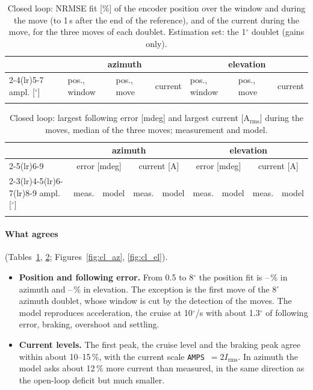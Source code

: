 \documentclass[10pt,a4paper]{article}
\numberwithin{equation}{section}
\begin{document}
\begin{table}[H]\centering\scriptsize\setlength{\tabcolsep}{3pt}
\caption{Closed loop: NRMSE fit [\%] of the encoder position over the window and during the move (to 1\,s after the end of the reference), and of the current during the move, for the three moves of each doublet. Estimation set: the 1$^\circ$ doublet (gains only).}\label{tab:cl}
\begin{tabular}{lllllll}\toprule
& \multicolumn{3}{c}{azimuth} & \multicolumn{3}{c}{elevation} \\
\cmidrule(lr){2-4}\cmidrule(lr){5-7}
ampl. [$^\circ$] & pos., window & pos., move & current & pos., window & pos., move & current \\ \midrule
\\ \bottomrule
\end{tabular}\end{table}

\begin{table}[H]\centering\footnotesize
\caption{Closed loop: largest following error [mdeg] and largest current [A$_\mathrm{rms}$] during the moves, median of the three moves; measurement and model.}\label{tab:cl_peaks}
\begin{tabular}{lrrrrrrrr}\toprule
& \multicolumn{4}{c}{azimuth} & \multicolumn{4}{c}{elevation} \\
\cmidrule(lr){2-5}\cmidrule(lr){6-9}
& \multicolumn{2}{c}{error [mdeg]} & \multicolumn{2}{c}{current [A]} & \multicolumn{2}{c}{error [mdeg]} & \multicolumn{2}{c}{current [A]} \\
\cmidrule(lr){2-3}\cmidrule(lr){4-5}\cmidrule(lr){6-7}\cmidrule(lr){8-9}
ampl. [$^\circ$] & meas. & model & meas. & model & meas. & model & meas. & model \\ \midrule
\\ \bottomrule
\end{tabular}\end{table}

\paragraph{What agrees} (Tables~\ref{tab:cl}, \ref{tab:cl_peaks}; Figures~\ref{fig:cl_az}, \ref{fig:cl_el}).
\begin{itemize}
\item \textbf{Position and following error.} From 0.5 to 8$^\circ$ the position fit is \clFitMinA--\clFitMaxA\,\% in azimuth and \clFitMinP--\clFitMaxP\,\% in elevation. The exception is the first move of the 8$^\circ$ azimuth doublet, whose window is cut by the detection of the moves. The model reproduces acceleration, the cruise at 10$^\circ$/s with about 1.3$^\circ$ of following error, braking, overshoot and settling.
\item \textbf{Current levels.} The first peak, the cruise level and the braking peak agree within about 10--15\,\%, with the current scale \texttt{AMPS}~$=2I_\mathrm{rms}$. In azimuth the model asks about 12\,\% more current than measured, in the same direction as the open-loop deficit but much smaller.
\end{itemize}
\end{document}
